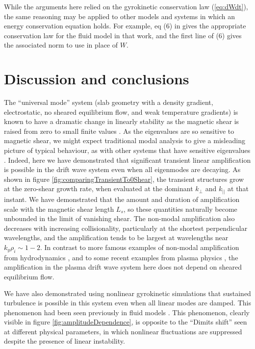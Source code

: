 \documentclass{jpp}
\begin{document}
While the arguments here relied on the gyrokinetic conservation law (\ref{eq:dWdt}), the same reasoning may be applied to
other models and systems in which an energy conservation equation holds. For example,
eq (6) in \citet{Drake} gives the appropriate conservation law for the fluid model
in that work, and the first line of (6) gives the associated norm to use in place of $W$.


\section{Discussion and conclusions}
\label{sec:conclusions}

The ``universal mode'' system (slab geometry with a density gradient,
electrostatic, no sheared equilibrium flow, and weak temperature
gradients) is known to have a dramatic change in linearly stability as
the magnetic shear is raised from zero to small finite values
\citep{Ross, Tsang, Antonsen,usUniversalInstability}.  As the
eigenvalues are so sensitive to magnetic shear, we might expect
traditional modal analysis to give a misleading picture of typical
behaviour, as with other systems that have sensitive eigenvalues
\citep{TrefethenEmbree}.  Indeed, here we have demonstrated that
significant transient linear amplification is possible in the drift
wave system even when all eigenmodes are decaying.  As shown in figure
\ref{fig:comparingTransientTo0Shear}, the transient structures grow at
the zero-shear growth rate, when evaluated at the dominant $k_{\perp}$
and $k_{||}$ at that instant.  We have demonstrated that the amount
and duration of amplification scale with the magnetic shear length
$L_s$, so these quantities naturally become unbounded in the limit of
vanishing shear.  The non-modal amplification also decreases with
increasing collisionality, particularly at the shortest perpendicular
wavelengths, and the amplification tends to be largest at wavelengths
near $k_y \rho_i \sim 1-2$.  In contrast to more famous examples of
non-modal amplification from hydrodynamics
\citep{TrefethenSubcritical}, and to some recent examples from plasma
physics \citep{Newton, EdmundPRL, BarnesRotation, Alex}, the
amplification in the plasma drift wave system here does not depend on
sheared equilibrium flow.

We have also demonstrated using nonlinear gyrokinetic simulations
that sustained turbulence is possible in this system
even when all linear modes are damped.
This phenomenon had been seen previously
in fluid models \citep{Scott1, Scott2, Drake}.
This phenomenon, clearly visible in figure \ref{fig:amplitudeDependence},
is opposite to the ``Dimits shift'' \citep{Dimits} seen at different physical parameters,
in which nonlinear fluctuations
are suppressed despite the presence of linear instability.
\end{document}
